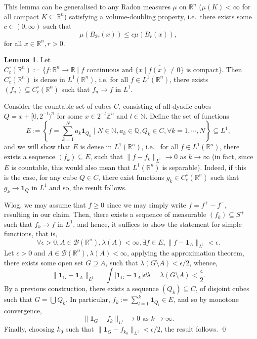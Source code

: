 \documentclass[
]{article}
\theoremstyle{definition}
\theoremstyle{definition}
\newtheorem{lemma}{Lemma}[section]
\begin{document}
This lemma can be generalised to any Radon measures \(\mu\) on
\(\mathbb{R}^n\) (\(\mu(K) < \infty\) for all compact
\(K \subseteq \mathbb{R}^n\)) satisfying a volume-doubling property,
i.e.~there exists some \(c \in (0, \infty)\) such that
\[\mu(B_{2r}(x)) \le c \mu(B_r(x)),\] for all
\(x \in \mathbb{R}^n, r > 0\).

\begin{lemma}
  Let \(C_c^\circ(\mathbb{R}^n) := \{f : \mathbb{R}^n \to \mathbb{R} \mid f 
    \text{ continuous and } \overline{\{x \mid f(x) \neq 0\}} \text{ is compact}\}\). 
  Then \(C_c^\circ(\mathbb{R}^n)\) is dense in \(L^1(\mathbb{R}^n)\), i.e. 
  for all \(f \in L^1(\mathbb{R}^n)\), there exists \((f_n) \subseteq C_c^\circ(\mathbb{R}^n)\) 
  such that \(f_n \to f\) in \(L^1\).
\end{lemma}
\proof

Consider the countable set of cubes \(C\), consisting of all dyadic
cubes \(Q = x + [0, 2^{-l})^n\) for some \(x \in 2^{-l} \mathbb{Z}^n\)
and \(l \in \mathbb{N}\). Define the set of functions
\[E := \left\{f = \sum_{k = 1}^N a_k \mathbf{1}_{Q_k} \mid 
    N \in \mathbb{N}, a_k \in \mathbb{Q}, Q_k \in C, \forall k = 1,\cdots, N\right\} 
    \subseteq L^1,\] and we will show that \(E\) is dense in
\(L^1(\mathbb{R}^n)\), i.e.~ for all \(f \in L^1(\mathbb{R}^n)\), there
exists a sequence \((f_k) \subseteq E\), such that
\(\|f - f_k\|_{L^1} \to 0\) as \(k \to \infty\) (in fact, since \(E\) is
countable, this would also mean that \(L^1(\mathbb{R}^n)\) is
separable). Indeed, if this is the case, for any cube \(Q \in C\), there
exist functions \(g_k \in C^\circ_c(\mathbb{R}^n)\) such that
\(g_k \to \mathbf{1}_Q\) in \(L^1\) and so, the result follows.

Wlog. we may assume that \(f \ge 0\) since we may simply write
\(f = f^+ - f^-\), resulting in our claim. Then, there exists a sequence
of measurable \((f_k) \subseteq S^+\) such that \(f_k \to f\) in
\(L^1\), and hence, it suffices to show the statement for simple
functions, that is,
\[\forall \epsilon > 0, A \in \mathcal{B}(\mathbb{R}^n), \lambda(A) < \infty, 
    \exists f \in E, \|f - \mathbf{1}_A\|_{L^1} < \epsilon.\] Let
\(\epsilon > 0\) and
\(A \in \mathcal{B}(\mathbb{R}^n), \lambda(A) < \infty\), applying the
approximation theorem, there exists some open set \(G \supseteq A\),
such that \(\lambda(G \setminus A) < \epsilon / 2\), whence,
\[\|\mathbf{1}_G - \mathbf{1}_A\|_{L^1} = \int |\mathbf{1}_G - \mathbf{1}_A| \dd \lambda 
  = \lambda(G \setminus A) < \frac{\epsilon}{2}.\] By a previous
construction, there exists a sequence \((Q_k) \subseteq C\), of disjoint
cubes such that \(G = \bigcup Q_k\). In particular,
\(f_k := \sum_{l = 1}^k \mathbf{1}_{Q_l} \in E\), and so by monotone
convergence,
\[\|\mathbf{1}_G - f_k\|_{L^1} \to 0 \text{ as } k \to \infty.\]
Finally, choosing \(k_0\) such that
\(\|\mathbf{1}_G - f_{k_0}\|_{L^1} < \epsilon / 2\), the result follows.
\qed
\end{document}
